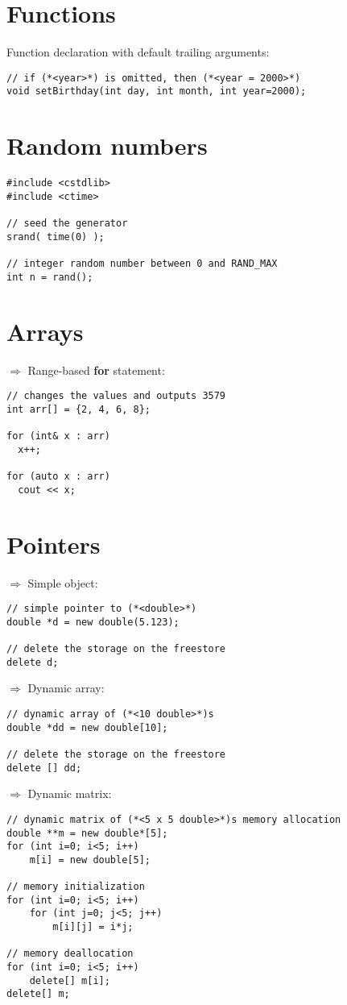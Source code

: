 \documentclass[10pt]{article}
\begin{document}
\section{Functions}
\small
Function declaration with
default trailing arguments:
\begin{lstlisting}
// if (*<year>*) is omitted, then (*<year = 2000>*)
void setBirthday(int day, int month, int year=2000);
\end{lstlisting}
%
%
\section{Random numbers}
\small
\begin{lstlisting}
#include <cstdlib>
#include <ctime>

// seed the generator
srand( time(0) );

// integer random number between 0 and RAND_MAX
int n = rand();
\end{lstlisting}
%
%
\section{Arrays}
\small
$\Rightarrow$ Range-based \textbf{for} statement:
\begin{lstlisting}
// changes the values and outputs 3579
int arr[] = {2, 4, 6, 8};

for (int& x : arr)
  x++;

for (auto x : arr)
  cout << x;
\end{lstlisting}
%
%
\section{Pointers}
\small
$\Rightarrow$ Simple object:
\begin{lstlisting}
// simple pointer to (*<double>*)
double *d = new double(5.123);

// delete the storage on the freestore
delete d;
\end{lstlisting}
$\Rightarrow$ Dynamic array:
\begin{lstlisting}
// dynamic array of (*<10 double>*)s
double *dd = new double[10];

// delete the storage on the freestore
delete [] dd;
\end{lstlisting}
$\Rightarrow$ Dynamic matrix:
\begin{lstlisting}
// dynamic matrix of (*<5 x 5 double>*)s memory allocation
double **m = new double*[5];
for (int i=0; i<5; i++)
    m[i] = new double[5];

// memory initialization    
for (int i=0; i<5; i++)
    for (int j=0; j<5; j++)
        m[i][j] = i*j;

// memory deallocation
for (int i=0; i<5; i++)
    delete[] m[i];
delete[] m;
\end{lstlisting}
%
%
\end{document}
